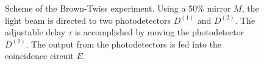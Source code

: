 \begin{figure}
\centering



\caption{Scheme of the Brown-Twiss experiment. Using a 50\% mirror $M$, the light beam is directed to two photodetectors $D^{(1)}$ and $D^{(2)}$. The adjustable delay $\tau$ is accomplished by moving the photodetector $D^{(2)}$. The output from the photodetectors is fed into the coincidence circuit $E$.}
\label{figPart3Nonclass2}
\end{figure}